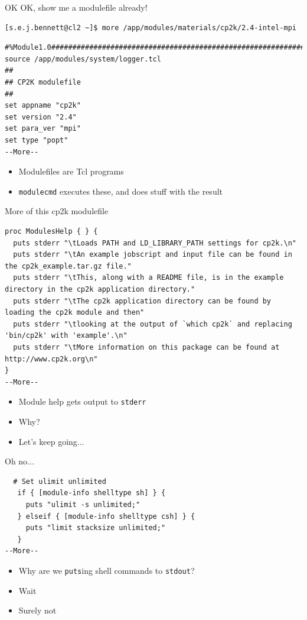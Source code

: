 \documentclass[handout]{beamer}
\begin{document}
\begin{frame}[fragile]{OK OK, show me a modulefile already!}
	
	\begin{verbatim}
[s.e.j.bennett@cl2 ~]$ more /app/modules/materials/cp2k/2.4-intel-mpi\end{verbatim}\pause\begin{verbatim}
#%Module1.0#####################################################################
source /app/modules/system/logger.tcl
##
## CP2K modulefile
##
set appname "cp2k"
set version "2.4"
set para_ver "mpi"
set type "popt"
--More--
\end{verbatim}

	\begin{itemize}[<+->]
		\item Modulefiles are Tcl programs
		\item \verb|modulecmd| executes these, and does stuff with the result
	\end{itemize}

\end{frame}

\begin{frame}[fragile]{More of this cp2k modulefile}
	
	\begin{verbatim}
proc ModulesHelp { } {
  puts stderr "\tLoads PATH and LD_LIBRARY_PATH settings for cp2k.\n"
  puts stderr "\tAn example jobscript and input file can be found in the cp2k_example.tar.gz file."
  puts stderr "\tThis, along with a README file, is in the example directory in the cp2k application directory."
  puts stderr "\tThe cp2k application directory can be found by loading the cp2k module and then"
  puts stderr "\tlooking at the output of `which cp2k` and replacing 'bin/cp2k' with 'example'.\n"
  puts stderr "\tMore information on this package can be found at http://www.cp2k.org\n"
}
--More--
\end{verbatim}

	\begin{itemize}[<+->]
		\item Module help gets output to \texttt{stderr}
		\item Why?
		\item Let's keep going...
	\end{itemize}
\end{frame}


\begin{frame}[fragile]{Oh no...}
	
	\begin{verbatim}
  # Set ulimit unlimited
   if { [module-info shelltype sh] } {
     puts "ulimit -s unlimited;"
   } elseif { [module-info shelltype csh] } {
     puts "limit stacksize unlimited;"
   }
--More--
\end{verbatim}

	\begin{itemize}[<+->]
		\item Why are we \verb|puts|ing shell commands to \verb|stdout|?
		\item Wait
		\item Surely not
	\end{itemize}
\end{frame}
\end{document}
